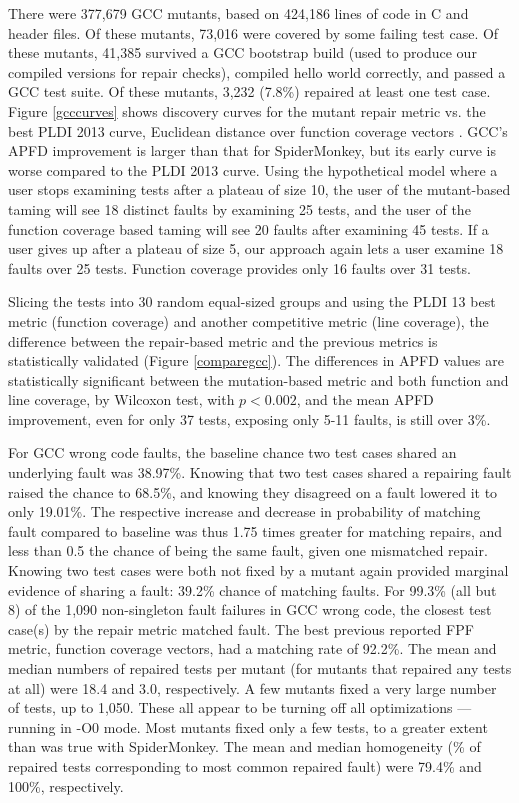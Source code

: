 There were 377,679 GCC mutants, based on 424,186 lines of code in C and header files. Of these mutants, 73,016 were covered by some failing test case.  Of these mutants, 41,385 survived a GCC bootstrap build (used to produce our compiled versions for repair checks), compiled hello world correctly, and passed a GCC test suite.  Of these mutants, 3,232 (7.8\%) repaired at least one test case.  Figure \ref{gcccurves} shows discovery curves for the mutant repair metric vs. the best PLDI 2013 curve, Euclidean distance over function coverage vectors \cite{PLDI13}.  GCC's APFD improvement is larger than that for SpiderMonkey, but its early curve is worse compared to the PLDI 2013 curve.  Using the hypothetical model where a user stops examining tests after a plateau of size 10, the user of the mutant-based taming will see 18 distinct faults by examining 25 tests, and the user of the function coverage based taming will see 20 faults after examining 45 tests.  If a user gives up after a plateau of size 5, our approach again lets a user examine 18 faults over 25 tests.  Function coverage provides only 16 faults over 31 tests. 

Slicing the tests into 30 random equal-sized groups and using the PLDI 13 best metric (function coverage) and another competitive metric (line coverage), the difference between the repair-based metric and the previous metrics is statistically validated (Figure \ref{comparegcc}).  The differences in APFD values are statistically significant between the mutation-based metric and both function and line coverage, by Wilcoxon test, with $p < 0.002$, and the mean APFD improvement, even for only 37 tests, exposing only 5-11 faults, is still over 3\%.

For GCC wrong code faults, the baseline chance two test cases shared an underlying fault was 38.97\%.  Knowing that two test cases shared a repairing fault raised the chance to 68.5\%, and knowing they disagreed on a fault lowered it to only 19.01\%.  The respective increase and decrease in probability of matching fault compared to baseline was thus 1.75 times greater for matching repairs, and less than 0.5 the chance of being the same fault, given one mismatched repair.  Knowing two test cases were both not fixed by a mutant again provided marginal evidence of sharing a fault: 39.2\% chance of matching faults.
For 99.3\% (all but 8) of the 1,090 non-singleton fault failures in GCC wrong code, the closest test case(s) by the repair metric matched fault.  The best previous reported FPF metric, function coverage vectors, had a matching rate of 92.2\%.   The mean and median numbers of repaired tests per mutant (for mutants that repaired any tests at all) were 18.4 and 3.0, respectively.  A few mutants fixed a very large number of tests, up to 1,050.  These all appear to be turning off all optimizations --- running in -O0 mode.  Most mutants fixed only a few tests, to a greater extent than was true with SpiderMonkey.    The mean and median homogeneity (\% of repaired tests corresponding to most common repaired fault) were 79.4\% and 100\%, respectively.

